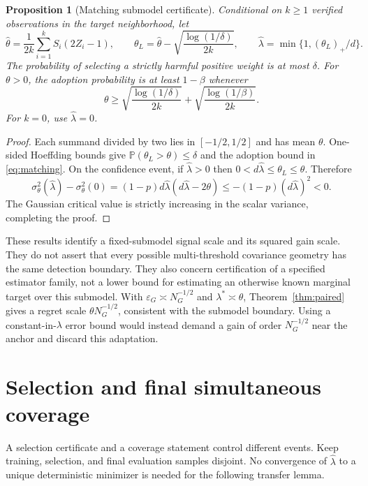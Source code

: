 \documentclass[11pt]{article}
\newtheorem{proposition}[theorem]{Proposition}
\theoremstyle{remark}\newtheorem{remark}[theorem]{Remark}
\newcommand{\Pp}{\mathbb P}
\begin{document}
\begin{proposition}[Matching submodel certificate]\label{prop:matching}
Conditional on $k\geq1$ verified observations in the target neighborhood, let
\[
 \widehat\theta=\frac1{2k}\sum_{i=1}^k S_i(2Z_i-1),\qquad
 \theta_L=\widehat\theta-\sqrt{\frac{\log(1/\delta)}{2k}},\qquad
 \widehat\lambda=\min\{1,(\theta_L)_+/d\}.
\]
The probability of selecting a strictly harmful positive weight is at most $\delta$.
For $\theta>0$, the adoption probability is at least $1-\beta$ whenever
\begin{equation}
 \theta\geq\sqrt{\frac{\log(1/\delta)}{2k}}+
               \sqrt{\frac{\log(1/\beta)}{2k}}.
 \label{eq:matching}
\end{equation}
For $k=0$, use $\widehat\lambda=0$.
\end{proposition}
\begin{proof}
Each summand divided by two lies in $[-1/2,1/2]$ and has mean $\theta$.
One-sided Hoeffding bounds give $\Pp(\theta_L>\theta)\leq\delta$ and the adoption bound in \eqref{eq:matching}.
On the confidence event, if $\widehat\lambda>0$ then
$0<d\widehat\lambda\leq\theta_L\leq\theta$. Therefore
\[
 \sigma_\theta^2(\widehat\lambda)-\sigma_\theta^2(0)
 =(1-p)d\widehat\lambda(d\widehat\lambda-2\theta)
 \leq-(1-p)(d\widehat\lambda)^2<0.
\]
The Gaussian critical value is strictly increasing in the scalar variance, completing the proof.
\end{proof}

These results identify a fixed-submodel signal scale and its squared gain scale. They do not assert that every possible multi-threshold covariance geometry has the same detection boundary. They also concern certification of a specified estimator family, not a lower bound for estimating an otherwise known marginal target over this submodel. With $\varepsilon_G\asymp N_G^{-1/2}$ and $\lambda^*\asymp\theta$, Theorem~\ref{thm:paired} gives a regret scale $\theta N_G^{-1/2}$, consistent with the submodel boundary. Using a constant-in-$\lambda$ error bound would instead demand a gain of order $N_G^{-1/2}$ near the anchor and discard this adaptation.

\section{Selection and final simultaneous coverage}
A selection certificate and a coverage statement control different events. Keep training, selection, and final evaluation samples disjoint. No convergence of $\widehat\lambda$ to a unique deterministic minimizer is needed for the following transfer lemma.
\end{document}
